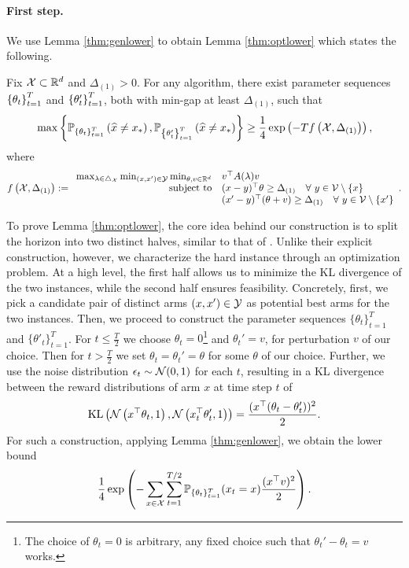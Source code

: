\paragraph{First step.} We use Lemma \ref{thm:genlower} to obtain Lemma \ref{thm:optlower} which states the following.
\begin{lemma}
    \label{thm:optlower}
    Fix $\mathcal{X} \subset \mathbb{R}^d$ and $\Delta_{(1)} > 0$. For any algorithm, there exist parameter sequences $\left\{\theta_t\right\}_{t=1}^{T}$ and $\left\{\theta'_t\right\}_{t=1}^{T}$, both with min-gap at least $\Delta_{(1)}$, such that 
    \begin{equation}
        \max\left\{\mathbb{P}_{\left\{\theta_t\right\}_{t=1}^{T}}\left(\widehat{x}\neq x_*\right), \mathbb{P}_{\left\{\theta'_t\right\}_{t=1}^{T}}\left(\widehat{x}\neq x_*\right)\right\} \geq \frac{1}{4} \exp \left(- T f\left(\mathcal{X}, \Delta_{(1)}\right) \right),
    \end{equation}
    where
    \begin{equation}\label{eq:optimization}f\left(\mathcal{X}, \Delta_{(1)}\right) := \begin{array}{rl}
        \max_{\lambda\in\triangle_{\mathcal{X}}}\min_{(x,x') \in \mathcal{Y}}\min_{\theta, v\in\mathbb{R}^d} & v^\top A(\lambda)v \\
        \mbox{\rm subject to} & (x - y)^\top\theta\geq \Delta_{(1)} \quad\forall~ y \in \mathcal{V} \setminus \{x\}\\
        & (x' - y)^\top(\theta + v)\geq \Delta_{(1)}\quad\forall~ y \in \mathcal{V} \setminus \{x'\}
    \end{array}.
    \end{equation}
\end{lemma}
 To prove Lemma \ref{thm:optlower}, the core idea behind our construction is to split the horizon into two distinct halves, similar to that of \citet{abbasi2018best}. Unlike their explicit construction, however, we characterize the hard instance through an optimization problem. At a high level, the first half allows us to minimize the KL divergence of the two instances, while the second half ensures feasibility. Concretely, first, we pick a candidate pair of distinct arms $(x,x') \in \mathcal{Y}$ as potential best arms for the two instances. Then, we proceed to construct the parameter sequences $\{\theta_t\}_{t=1}^{T}$ and $\{\theta'_t\}_{t=1}^{T}$. For $t \leq \frac{T}{2}$ we choose $\theta_t = 0$\footnote{The choice of $\theta_t = 0$ is arbitrary, any fixed choice such that $\theta_t'-\theta_t = v$ works.} and $\theta_t' =v$, for perturbation $v$ of our choice. Then for $t > \frac{T}{2}$ we set $\theta_t = \theta_t' = \theta$ for some $\theta$ of our choice. Further, we use the noise distribution $\epsilon_t \sim \mathcal{N}(0,1)$ for each $t$, resulting in a KL divergence between the reward distributions of arm $x$ at time step $t$ of \begin{equation}
     \mathrm{KL}\left(\mathcal{N}\left(x^\top\theta_t,1\right), \mathcal{N}\left(x_t^\top\theta_t',1\right)\right) =\frac{(x^\top (\theta_t - \theta'_t))^2}{2}.
 \end{equation} For such a construction, applying Lemma \ref{thm:genlower}, we obtain the lower bound\begin{equation}
     \frac{1}{4} \exp \left(-\sum_{x \in \mathcal{X}}\sum_{t=1}^{T/2}\mathbb{P}_{\{\theta_t\}_{t=1}^{T}}(x_t=x)\frac{(x^\top v)^2}{2}  \right).
 \end{equation}
